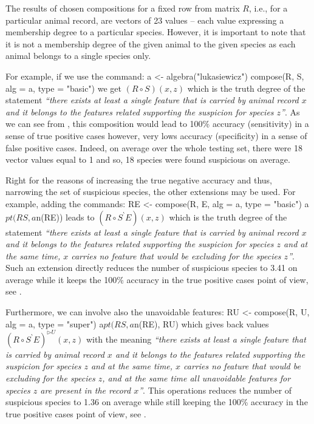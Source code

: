 \documentclass[review]{elsarticle}
\newenvironment{Sinput}{\endgraf\verbatim}{\endverbatim}
\begin{document}
The results of chosen compositions for a fixed row from matrix $R$, i.e., for a particular animal record, are vectors of 23 values -- each value expressing a membership degree to a particular species. However, it is important to note that it is not a membership degree of the given animal to the given species as each animal belongs to a single species only. 

For example, if we use the command:
\begin{Sinput}
a <- algebra("lukasiewicz")
compose(R, S, alg = a, type = "basic")
\end{Sinput}
we get $(R\circ S)(x,z)$ which is the truth degree of the statement \emph{``there exists at least a single feature that is carried by animal record $x$ and it belongs to the features related supporting the suspicion for species $z$''}. As we can see from \cite{Step_etal:Unavoidable_KNOSYS2020}, this composition would lead to 100\% accuracy (sensitivity) in a sense of true positive cases however, very lows accuracy (specificity) in a sense of false positive cases. Indeed, on average over the whole testing set, there were 18 vector values equal to 1 and so, 18 species were found suspicious on average.  

Right for the reasons of increasing the true negative accuracy and thus, narrowing the set of suspicious species, the other extensions may be used. For example, adding the commands:
\begin{Sinput}
RE <- compose(R, E, alg = a, type = "basic")
a$pt(RS, a$n(RE))
\end{Sinput}
leads to $(R\circ S^{\backprime}E )(x,z)$ which is the truth degree of the statement \emph{``there exists at least a single feature that is carried by animal record $x$ and it belongs to the features related supporting the suspicion for species $z$ and at the same time, $x$ carries no feature that would be excluding for the species $z$''}. Such an extension directly reduces the number of suspicious species to 3.41 on average while it keeps the 100\% accuracy in the true positive cases point of view, see \cite{Step_etal:Unavoidable_KNOSYS2020}.

Furthermore, we can involve also the unavoidable features:
\begin{Sinput}
RU <- compose(R, U, alg = a, type = "super")
a$pt(RS, a$n(RE), RU)
\end{Sinput}
which gives back values $(R\circ S^{\backprime}E )^{\rhd U}(x,z)$ with the meaning \emph{``there exists at least a single feature that is carried by animal record $x$ and it belongs to the features related supporting the suspicion for species $z$ and at the same time, $x$ carries no feature that would be excluding for the species $z$, and at the same time all unavoidable features for species $z$ are present in the record $x$''}. This operations reduces the number of suspicious species to 1.36 on average while still keeping the 100\% accuracy in the true positive cases point of view, see \cite{Step_etal:Unavoidable_KNOSYS2020}.
\end{document}
